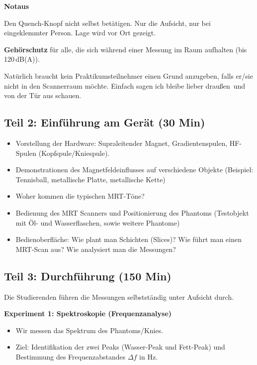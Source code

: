 \documentclass[a4paper,11pt]{article}
\newif\ifintern
\newcommand{\absatzkopf}[1]{\par\vspace{2pt}\textbf{#1}\par\nopagebreak}
\newcommand{\intern}[1]{\ifintern\begin{internbox}#1\end{internbox}\fi}
\begin{document}
\begin{list}{}{\leftmargin=8mm\itemsep=0pt\topsep=0pt}
\absatzkopf{Notaus}
Den Quench-Knopf nicht selbst betätigen. Nur die Aufsicht, nur bei eingeklemmter Person. Lage wird vor Ort gezeigt.

\textbf{Gehörschutz} für alle, die sich während einer Messung im Raum aufhalten (bis 120\,dB(A)).

Natürlich braucht kein Praktikumsteilnehmer einen Grund anzugeben, falls er/sie nicht in den Scannerraum möchte. Einfach sagen \glqq ich bleibe lieber draußen\grqq\ und von der Tür aus schauen.
\end{list}

\subsection*{Teil 2: Einführung am Gerät (30 Min)}
\begin{itemize}
\item Vorstellung der Hardware: Supraleitender Magnet, Gradientenspulen, HF-Spulen (Kopfspule/Kniespule).
\item Demonstrationen des Magnetfeldeinflusses auf verschiedene Objekte (Beispiel: Tennisball, metallische Platte, metallische Kette)
\item Woher kommen die typischen MRT-Töne?
\item Bedienung des MRT Scanners und Positionierung des Phantoms (Testobjekt mit Öl- und Wasserflaschen, sowie weitere Phantome)
\item Bedienoberfläche: Wie plant man Schichten (Slices)? Wie führt man einen MRT-Scan aus? Wie analysiert man die Messungen?
\end{itemize}

\subsection*{Teil 3: Durchführung (150 Min)}
Die Studierenden führen die Messungen selbstständig unter Aufsicht durch.

\absatzkopf{Experiment 1: Spektroskopie (Frequenzanalyse)}
\begin{itemize}
\item Wir messen das Spektrum des Phantoms/Knies.
\intern{Eventuell reicht es, die $f_0$-Bestimmung bei einer beliebigen Sequenz auf manuell zu stellen. Dann ploppt einmal das Spektrum auf und vielleicht kann man daran ja schon den Frequenzabstand zwischen Wasser- und Fettpeak bestimmen. Man würde vielleicht auch sehen, dass das Fettspektrum gar nicht nur einen scharfen Frequenzpeak aufweist. Sollen die Studis eigentlich auch noch sehen, wie eine Fettsuppression funktioniert bzw.\ nicht mehr funktioniert, wenn der $f_0$-Peak nicht richtig getroffen wird? Dann könnte man auch mal witzweise den $f_0$-Peak einmal in den Wasserpeak legen und einmal in den Fettpeak (fett- bzw.\ wasserselektive Bildgebung) - auch hierüber kann man ja theoretisch eine Fettgehaltsbestimmung durchführen. Oder führt das an der Stelle zu weit?}
\item Ziel: Identifikation der zwei Peaks (Wasser-Peak und Fett-Peak) und Bestimmung des Frequenzabstandes $\Delta f$ in Hz.
\end{itemize}
\end{document}
